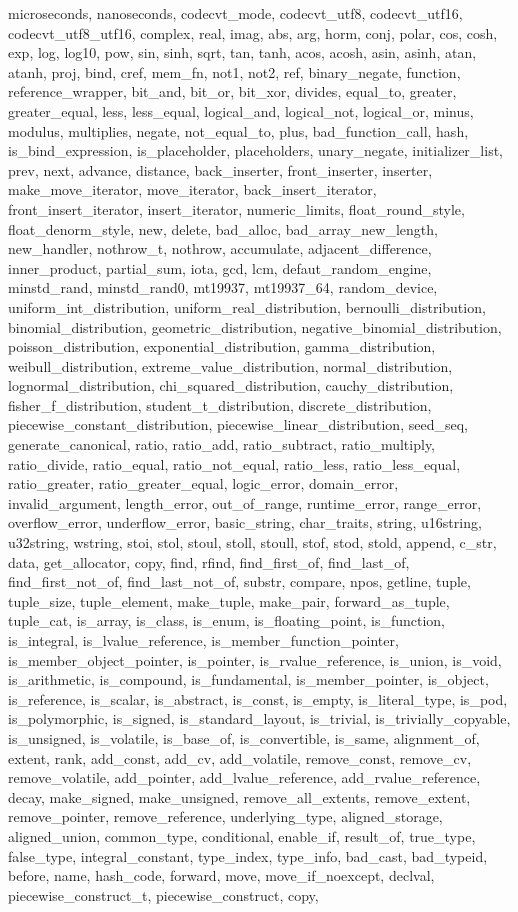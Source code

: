 {microseconds, nanoseconds, codecvt_mode, codecvt_utf8, codecvt_utf16, codecvt_utf8_utf16, complex, real, imag, abs, arg, horm, conj, polar, cos, cosh, exp, log, log10, pow, sin, sinh, sqrt, tan, tanh, acos, acosh, asin, asinh, atan, atanh, proj, bind, cref, mem_fn, not1, not2, ref, binary_negate, function, reference_wrapper, bit_and, bit_or, bit_xor, divides, equal_to, greater, greater_equal, less, less_equal, logical_and, logical_not, logical_or, minus, modulus, multiplies, negate, not_equal_to, plus, bad_function_call, hash, is_bind_expression, is_placeholder, placeholders, unary_negate, initializer_list, prev, next, advance, distance, back_inserter, front_inserter, inserter, make_move_iterator, move_iterator, back_insert_iterator, front_insert_iterator, insert_iterator, numeric_limits, float_round_style, float_denorm_style, new, delete, bad_alloc, bad_array_new_length, new_handler, nothrow_t, nothrow, accumulate, adjacent_difference, inner_product, partial_sum, iota, gcd, lcm, defaut_random_engine, minstd_rand, minstd_rand0, mt19937, mt19937_64, random_device, uniform_int_distribution, uniform_real_distribution, bernoulli_distribution, binomial_distribution, geometric_distribution, negative_binomial_distribution, poisson_distribution, exponential_distribution, gamma_distribution, weibull_distribution, extreme_value_distribution, normal_distribution, lognormal_distribution, chi_squared_distribution, cauchy_distribution, fisher_f_distribution, student_t_distribution, discrete_distribution, piecewise_constant_distribution, piecewise_linear_distribution, seed_seq, generate_canonical, ratio, ratio_add, ratio_subtract, ratio_multiply, ratio_divide, ratio_equal, ratio_not_equal, ratio_less, ratio_less_equal, ratio_greater, ratio_greater_equal, logic_error, domain_error, invalid_argument, length_error, out_of_range, runtime_error, range_error, overflow_error, underflow_error, basic_string, char_traits, string, u16string, u32string, wstring, stoi, stol, stoul, stoll, stoull, stof, stod, stold, append, c_str, data, get_allocator, copy, find, rfind, find_first_of, find_last_of, find_first_not_of, find_last_not_of, substr, compare, npos, getline, tuple, tuple_size, tuple_element, make_tuple, make_pair, forward_as_tuple, tuple_cat, is_array, is_class, is_enum, is_floating_point, is_function, is_integral, is_lvalue_reference, is_member_function_pointer, is_member_object_pointer, is_pointer, is_rvalue_reference, is_union, is_void, is_arithmetic, is_compound, is_fundamental, is_member_pointer, is_object, is_reference, is_scalar, is_abstract, is_const, is_empty, is_literal_type, is_pod, is_polymorphic, is_signed, is_standard_layout, is_trivial, is_trivially_copyable, is_unsigned, is_volatile, is_base_of, is_convertible, is_same, alignment_of, extent, rank, add_const, add_cv, add_volatile, remove_const, remove_cv, remove_volatile, add_pointer, add_lvalue_reference, add_rvalue_reference, decay, make_signed, make_unsigned, remove_all_extents, remove_extent, remove_pointer, remove_reference, underlying_type, aligned_storage, aligned_union, common_type, conditional, enable_if, result_of, true_type, false_type, integral_constant, type_index, type_info, bad_cast, bad_typeid, before, name, hash_code, forward, move, move_if_noexcept, declval, piecewise_construct_t, piecewise_construct, copy, }
